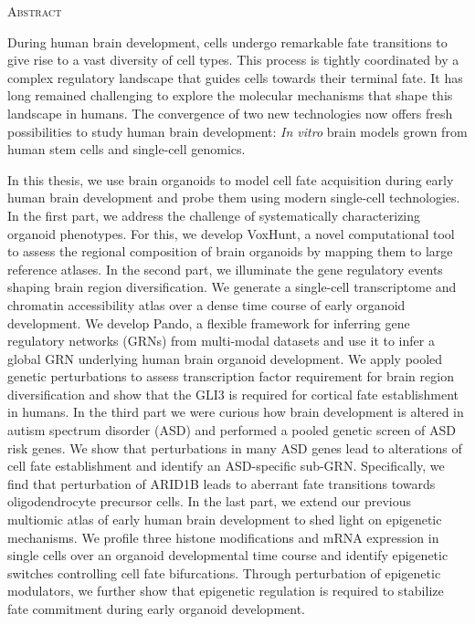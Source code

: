 \begin{center}
    \large\textsc{Abstract}
\end{center}

During human brain development, cells undergo remarkable fate transitions to give rise to a vast diversity of cell types. This process is tightly coordinated by a complex regulatory landscape that guides cells towards their terminal fate. It has long remained challenging to explore the molecular mechanisms that shape this landscape in humans. The convergence of two new technologies now offers fresh possibilities to study human brain development: \textit{In vitro} brain models grown from human stem cells and single-cell genomics. 

In this thesis, we use brain organoids to model cell fate acquisition during early human brain development and probe them using modern single-cell technologies. In the first part, we address the challenge of systematically characterizing organoid phenotypes. For this, we develop VoxHunt, a novel computational tool to assess the regional composition of brain organoids by mapping them to large reference atlases. In the second part, we illuminate the gene regulatory events shaping brain region diversification. We generate a single-cell transcriptome and chromatin accessibility atlas over a dense time course of early organoid development. We develop Pando, a flexible framework for inferring gene regulatory networks (GRNs) from multi-modal datasets and use it to infer a global GRN underlying human brain organoid development. We apply pooled genetic perturbations to assess transcription factor requirement for brain region diversification and show that the GLI3 is required for cortical fate establishment in humans. In the third part we were curious how brain development is altered in autism spectrum disorder (ASD) and performed a pooled genetic screen of ASD risk genes. We show that perturbations in many ASD genes lead to alterations of cell fate establishment and identify an ASD-specific sub-GRN. Specifically, we find that perturbation of ARID1B leads to aberrant fate transitions towards oligodendrocyte precursor cells. In the last part, we extend our previous multiomic atlas of early human brain development to shed light on epigenetic mechanisms. We profile three histone modifications and mRNA expression in single cells over an organoid developmental time course and identify epigenetic switches controlling cell fate bifurcations. Through perturbation of epigenetic modulators, we further show that epigenetic regulation is required to stabilize fate commitment during early organoid development. 

